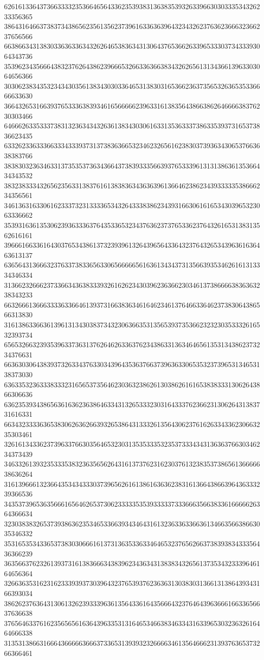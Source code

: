 62616133643736633332353664656433623539383136383539326339663030333534326233356365
38643164663738373438656235613562373961633636396432343262376362366632366237656566
66386634313830336363363432626465383634313064376536626339653330373433393064343736
35396234356664383237626438623966653266336366383432626561313436613963303064656366
30306238343532343430356138343030336465313830316536623637356532636535336666633630
36643265316639376533363839346165666662396331613835643866386264666638376230303466
64666263353337383132363434326361383430306163313536333738633539373165373836623435
63326233633366333433393731373836366532346232656162383037393634306537663638383766
38383032363463313735353736343664373839333566393765333961313138636135366434343532
38323833343265623563313837616138383634363639613664623862343933333538666234356561
34613631633061623337323133336534326433383862343931663061616534303965323063336662
35393163613530623936333637643533653234376362373765336237643261653138313562616161
39666166336164303765343861373239396132643965643364323764326534396361636463613137
63656431366632376337383365633065666665616361343437313566393534626161313334346334
31366232666237336634363833393261626234303962363662303461373866663836363238343233
66326661366633336336646139373166383634616462346137646633646237383064386566313830
31613863366361396131343038373432306366353135653937353662323230353332616532393734
65653266323935396337363137626462633637623438633136346465613531343862373234376631
66363030643839373263343763303439643536376637396363306535323739653134653138373030
63633532363338333231656537356462303632386261303862616165383833313062643866306636
63623539343865636163623638646334313265333230316433376236623130626431383731616331
66343233336365383062636266393265386431333261356430623761626334336230663235303461
32616134336237396337663035646532303135353335323537333434313636376630346234373439
34633261393235333538323635656264316137376231623037613238353738656136666638636264
31613966613236643534343330373965626161386163636238316136643866396436333239366536
34353739653635666165646265373062333335353933333733366635663833616666626364366634
32303838326537393863623534653366393434643161323633633663613466356638663035346332
35316535343365373830306661613731363533633464653237656266373839383433356436366239
36356637623261393731613836663438396234363431383834326561373534323339646164656364
32663635316231623339393730396432376539376236363130383031366131386439343166393034
38626237636431306132623933396361356433616435666432376464396366616633656637636638
37656463376162356565616364396335313164653466383463343163396530323632616464666338
31353138663166643666663666373365313939323266663461356466623139376365373266366461

